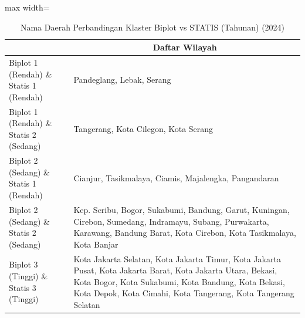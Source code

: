 \begin{table}[H]
\centering
\caption{Nama Daerah Perbandingan Klaster Biplot vs STATIS (Tahunan) (2024)} \label{tab:app1biplot_statis_comp_name_2024}
\begin{adjustbox}{max width=\textwidth}
\begin{tabular}{|>{\centering\arraybackslash}p{4cm}|p{10cm}|}
\hline
\multicolumn{1}{|c|}{\textbf{Kategori}} & \multicolumn{1}{c|}{\textbf{Daftar Wilayah}} \\
\hline
Biplot 1 (Rendah) \& Statis 1 (Rendah) & Pandeglang, Lebak, Serang \\
\hline
Biplot 1 (Rendah) \& Statis 2 (Sedang) & Tangerang, Kota Cilegon, Kota Serang \\
\hline
Biplot 2 (Sedang) \& Statis 1 (Rendah) & Cianjur, Tasikmalaya, Ciamis, Majalengka, Pangandaran \\
\hline
Biplot 2 (Sedang) \& Statis 2 (Sedang) & Kep. Seribu, Bogor, Sukabumi, Bandung, Garut, Kuningan, Cirebon, Sumedang, Indramayu, Subang, Purwakarta, Karawang, Bandung Barat, Kota Cirebon, Kota Tasikmalaya, Kota Banjar \\
\hline
Biplot 3 (Tinggi) \& Statis 3 (Tinggi) & Kota Jakarta Selatan, Kota Jakarta Timur, Kota Jakarta Pusat, Kota Jakarta Barat, Kota Jakarta Utara, Bekasi, Kota Bogor, Kota Sukabumi, Kota Bandung, Kota Bekasi, Kota Depok, Kota Cimahi, Kota Tangerang, Kota Tangerang Selatan \\
\hline
\end{tabular}
\end{adjustbox}
\end{table}